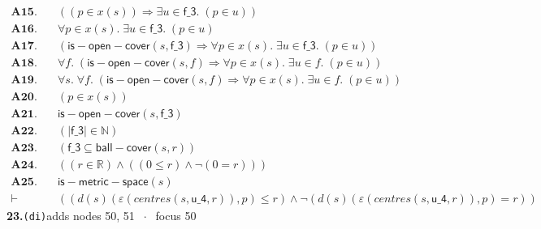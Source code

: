 \documentclass[11pt]{article}
\begin{document}
\begin{align*}
  \mathbf{A15.}\quad & ((p \in x(s)) \Rightarrow \exists u \in \mathsf{f\_3}.\; (p \in u)) \\
  \mathbf{A16.}\quad & \forall p \in x(s).\; \exists u \in \mathsf{f\_3}.\; (p \in u) \\
  \mathbf{A17.}\quad & (\mathsf{is{-}open{-}cover}(s, \mathsf{f\_3}) \Rightarrow \forall p \in x(s).\; \exists u \in \mathsf{f\_3}.\; (p \in u)) \\
  \mathbf{A18.}\quad & \forall f.\; (\mathsf{is{-}open{-}cover}(s, f) \Rightarrow \forall p \in x(s).\; \exists u \in f.\; (p \in u)) \\
  \mathbf{A19.}\quad & \forall s.\; \forall f.\; (\mathsf{is{-}open{-}cover}(s, f) \Rightarrow \forall p \in x(s).\; \exists u \in f.\; (p \in u)) \\
  \mathbf{A20.}\quad & (p \in x(s)) \\
  \mathbf{A21.}\quad & \mathsf{is{-}open{-}cover}(s, \mathsf{f\_3}) \\
  \mathbf{A22.}\quad & (|\mathsf{f\_3}| \in \mathbb{N}) \\
  \mathbf{A23.}\quad & (\mathsf{f\_3} \subseteq \mathsf{ball{-}cover}(s, r)) \\
  \mathbf{A24.}\quad & ((r \in \mathbb{R}) \wedge ((0 \leq r) \wedge \neg (0 = r))) \\
  \mathbf{A25.}\quad & \mathsf{is{-}metric{-}space}(s) \\
  \vdash\quad & ((d(s)(\varepsilon(\mathit{centres}(s, \mathsf{u\_4}, r)), p) \leq r) \wedge \neg (d(s)(\varepsilon(\mathit{centres}(s, \mathsf{u\_4}, r)), p) = r))
\end{align*}
\medskip\noindent\textbf{23.}\quad \texttt{(di)}\hfill{\small adds nodes 50, 51 $\;\cdot\;$ focus 50}\\[2pt]
\end{document}
